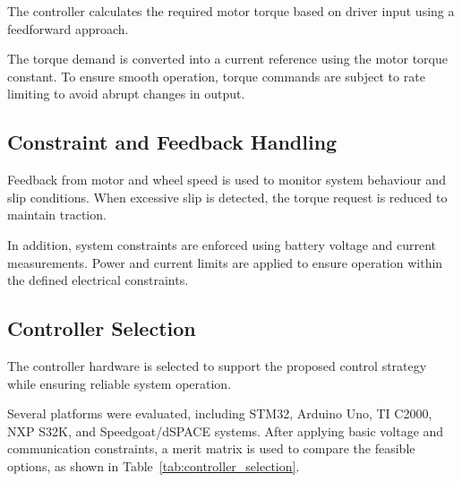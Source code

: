 \documentclass[11pt, a4paper]{report}
\numberwithin{equation}{section}
\begin{document}
The controller calculates the required motor torque based on driver input using a feedforward approach.

The torque demand is converted into a current reference using the motor torque constant. To ensure smooth operation, torque commands are subject to rate limiting to avoid abrupt changes in output.

\subsection{Constraint and Feedback Handling}

Feedback from motor and wheel speed is used to monitor system behaviour and slip conditions. When excessive slip is detected, the torque request is reduced to maintain traction.

In addition, system constraints are enforced using battery voltage and current measurements. Power and current limits are applied to ensure operation within the defined electrical constraints.

\subsection{Controller Selection}

The controller hardware is selected to support the proposed control strategy while ensuring reliable system operation.

Several platforms were evaluated, including STM32\cite{stm32-nucleo-f4}, Arduino Uno\cite{Arduino_uno_data_sheet}, TI C2000\cite{TI_C200_data_sheet}, NXP S32K\cite{NPX_S32K_data_sheet}, and Speedgoat/dSPACE systems\cite{Speedgoat_data_sheet}.
After applying basic voltage and communication constraints, a merit matrix is used to compare the feasible options, as shown in Table~\ref{tab:controller_selection}.
\end{document}
